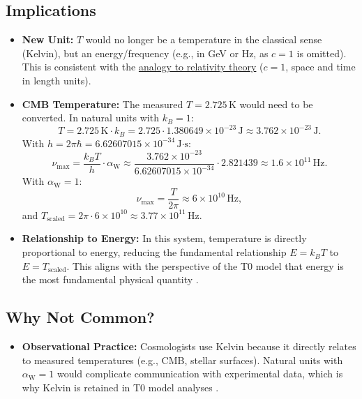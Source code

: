 \documentclass[12pt,a4paper]{article}
\newcommand{\alphaW}{\alpha_{\text{W}}}
\begin{document}
	\subsection{Implications}
	\label{subsec:implications}
	\begin{tcolorbox}[colback=blue!5!white,colframe=blue!75!black,title={Implications of \(\alphaW = 1\)}]
		\begin{itemize}
			\item \textbf{New Unit:} \(T\) would no longer be a temperature in the classical sense (Kelvin), but an energy/frequency (e.g., in GeV or Hz, as \(c = 1\) is omitted). This is consistent with the \href{https://github.com/jpascher/T0-Time-Mass-Duality/tree/main/2/pdf/English/ZeitRaumPascherEn.pdf}{analogy to relativity theory} (\(c = 1\), space and time in length units).
			\item \textbf{CMB Temperature:} The measured \(T = 2.725 \, \text{K}\) would need to be converted. In natural units with \(k_B = 1\):
			\[
			T = 2.725 \, \text{K} \cdot k_B = 2.725 \cdot 1.380649 \times 10^{-23} \, \text{J} \approx 3.762 \times 10^{-23} \, \text{J}.
			\]
			With \(h = 2\pi \hbar = 6.62607015 \times 10^{-34} \, \text{J·s}\):
			\[
			\nu_{\text{max}} = \frac{k_B T}{h} \cdot \alphaW \approx \frac{3.762 \times 10^{-23}}{6.62607015 \times 10^{-34}} \cdot 2.821439 \approx 1.6 \times 10^{11} \, \text{Hz}.
			\]
			With \(\alphaW = 1\):
			\[
			\nu_{\text{max}} = \frac{T}{2\pi} \approx 6 \times 10^{10} \, \text{Hz},
			\]
			and \(T_{\text{scaled}} = 2\pi \cdot 6 \times 10^{10} \approx 3.77 \times 10^{11} \, \text{Hz}\).
			\item \textbf{Relationship to Energy:} In this system, temperature is directly proportional to energy, reducing the fundamental relationship \(E = k_B T\) to \(E = T_{\text{scaled}}\). This aligns with the perspective of the T0 model that energy is the most fundamental physical quantity \cite{pascher_alpha_2025}.
		\end{itemize}
	\end{tcolorbox}
	
	\subsection{Why Not Common?}
	\label{subsec:why_not_common}
	
	\begin{itemize}
		\item \textbf{Observational Practice:} Cosmologists use Kelvin because it directly relates to measured temperatures (e.g., CMB, stellar surfaces). Natural units with \(\alphaW = 1\) would complicate communication with experimental data, which is why Kelvin is retained in T0 model analyses \cite{pascher_messdifferenzen_2025}.
	\end{itemize}
	
\end{document}
